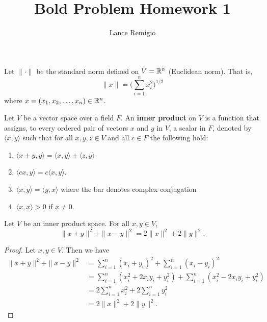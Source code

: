\documentclass[a4paper]{article}
\title{Bold Problem Homework 1}
\author{Lance Remigio}
\begin{document}
\maketitle
{}
\rhead{\thepage}

Let \( \|\cdot\| \) be the standard norm defined on \( V =  \mathbb{R}^{n} \) (Euclidean norm). That is, 
\[  \|x\| =  \Big(  \sum_{ i=1  }^{ n } {x}_{i}^{2} \Big)^{1/2} \]
where \( x = ({x}_{1}, {x}_{2}, \dots, {x}_{n}) \in \mathbb{R}^{n} \).

\begin{definition}
    Let \( V  \) be a vector space over a field \( F  \). An \textbf{inner product} on \( V  \) is a function that assigns, to every ordered pair of vectors \( x  \) and \( y  \) in \( V \), a scalar in \( F  \), denoted by \( \langle x , y \rangle \) such that for all \( x,y,z \in V  \) and all \( c \in F \) the following hold:
    \begin{enumerate}
        \item[(a)] \( \langle x + y  , y  \rangle = \langle x , y \rangle + \langle z  , y \rangle \)
        \item[(b)] \( \langle cx , y \rangle = c \langle x  , y \rangle \).
        \item[(c)] \( \overline{\langle x , y \rangle} = \langle y , x \rangle \) where the bar denotes complex conjugation 
        \item[(d)] \( \langle x , x \rangle > 0  \) if \( x \neq 0  \).
    \end{enumerate}
\end{definition}

\begin{lemma}
   Let \( V  \) be an inner product space. For all \( x,y \in V  \),  
   \[  \|x + y\|^{2} + \|x - y\|^{2} = 2 \|x\|^{2} + 2 \|y\|^{2}. \]
\end{lemma}

\begin{proof}
Let \( x,y \in V  \). Then we have 
\begin{align*}
    \|x + y\|^{2} + \|x - y\|^{2} &= \sum_{ i=1  }^{ n } ({x}_{i} + {y}_{i})^{2} + \sum_{ i=1  }^{ n } ({x}_{i} - {y}_{i})^{2}  \\
                                  &= \sum_{ i=1  }^{ n } ({x}_{i}^{2} + 2 {x}_{i} {y}_{i} + {y}_{i}^{2}) + \sum_{ i=1  }^{ n } ({x}_{i}^{2} - 2 {x}_{i}{y}_{i} + {y}_{i}^{2}) \\
                                  &= 2\sum_{ i=1  }^{ n } {x}_{i}^{2} + 2\sum_{ i=1  }^{ n } {y}_{i}^{2} \\
                                  &= 2 \|x\|^{2}  + 2 \|y\|^{2}.
\end{align*}
\end{proof}
\end{document}
